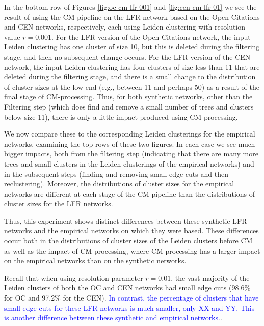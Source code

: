 \documentclass[11pt]{article}   	%
\begin{document}
In the bottom row of Figures \ref{fig:oc-cm-lfr-001} and  \ref{fig:cen-cm-lfr-01} we see the result of using the CM-pipeline on the LFR network based on the Open Citations  and CEN networks, respectively, each using Leiden clustering with
resolution value $r=0.001$.
For the LFR version of the Open Citations network, the input Leiden clustering has one cluster of size 10, but this is deleted during the filtering stage, and then no subsequent change occurs. 
For the LFR version of the CEN network, the input Leiden clustering has four clusters of size less than 11 that are  deleted during the filtering stage, and there is a small change to the distribution of cluster sizes at the low end (e.g., between 11 and perhaps 50) as a result of the final stage of CM-processing.
Thus, for both synthetic networks, other than the Filtering step (which does find and remove a small number of trees and clusters below size 11), there is only a little
impact produced using CM-processing. 

We now compare these to the corresponding Leiden clusterings for the empirical networks, examining the top rows of these two figures. 
In each case we see much bigger impacts, both from the filtering step (indicating that there are many more  trees and small clusters in the Leiden clusterings of the empirical 
networks) and in the subsequent steps (finding and removing small edge-cuts and then reclustering).  
Moreover, the distributions of cluster sizes for the empirical networks are different at each stage of the CM pipeline than the distributions of cluster sizes for the LFR networks.

Thus, this experiment shows distinct differences between these synthetic LFR networks and the empirical networks on which they were based. 
These differences occur both in the distributions of cluster sizes of the Leiden clusters before CM as well as the impact of CM-processing, where CM-processing has a larger impact on the empirical networks than on the synthetic networks.

Recall that when using resolution parameter $r=0.01$, the vast majority of the Leiden clusters of both the OC and CEN networks had small edge cuts (98.6\% for OC and 97.2\% for the CEN).
\textcolor{blue}{In contrast, the percentage of clusters that have small edge cuts for these LFR networks is much smaller, only XX and YY. This is another difference between these synthetic and empirical networks.}.
\end{document}
